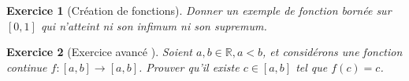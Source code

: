 \documentclass{article}
\newcommand{\Rr}{{\mathbb{R}}}
\theoremstyle{exercice}
\newtheorem{exercice}{Exercice}
\begin{document}
\begin{exercice}[Création de fonctions]
    
Donner un exemple de fonction bornée sur $[0,1]$ qui n'atteint ni son infimum ni son supremum.
\end{exercice}

\begin{exercice}[Exercice avancé ]
 Soient $a, b \in \Rr, a < b$, et considérons une fonction continue $f : [a, b] \to [a, b]$. Prouver qu’il existe $c \in[a, b]$ tel que $f(c)=c$. 
    
\end{exercice}
\end{document}
